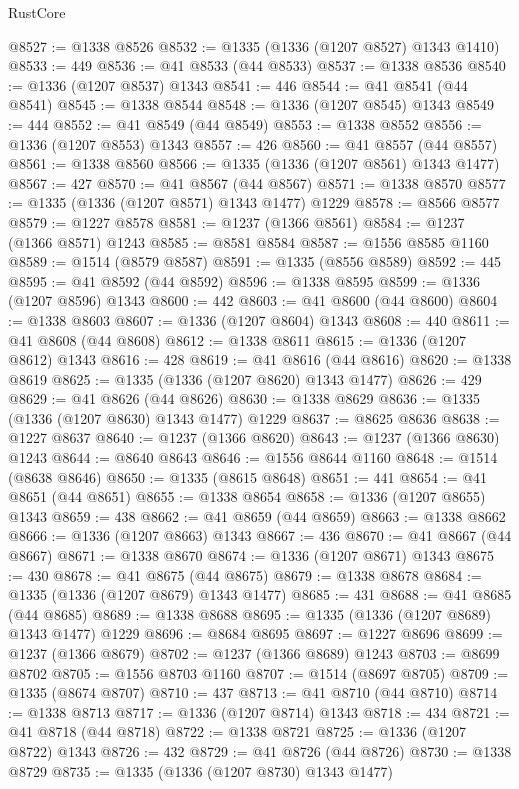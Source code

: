 \begin{lexlean}{RustCore}
\begin{coremodule}
@8527 := @1338 @8526
@8532 := @1335 (@1336 (@1207 @8527) @1343 @1410)
@8533 := 449
@8536 := @41 @8533 (@44 @8533)
@8537 := @1338 @8536
@8540 := @1336 (@1207 @8537) @1343
@8541 := 446
@8544 := @41 @8541 (@44 @8541)
@8545 := @1338 @8544
@8548 := @1336 (@1207 @8545) @1343
@8549 := 444
@8552 := @41 @8549 (@44 @8549)
@8553 := @1338 @8552
@8556 := @1336 (@1207 @8553) @1343
@8557 := 426
@8560 := @41 @8557 (@44 @8557)
@8561 := @1338 @8560
@8566 := @1335 (@1336 (@1207 @8561) @1343 @1477)
@8567 := 427
@8570 := @41 @8567 (@44 @8567)
@8571 := @1338 @8570
@8577 := @1335 (@1336 (@1207 @8571) @1343 @1477) @1229
@8578 := @8566 @8577
@8579 := @1227 @8578
@8581 := @1237 (@1366 @8561)
@8584 := @1237 (@1366 @8571) @1243
@8585 := @8581 @8584
@8587 := @1556 @8585 @1160
@8589 := @1514 (@8579 @8587)
@8591 := @1335 (@8556 @8589)
@8592 := 445
@8595 := @41 @8592 (@44 @8592)
@8596 := @1338 @8595
@8599 := @1336 (@1207 @8596) @1343
@8600 := 442
@8603 := @41 @8600 (@44 @8600)
@8604 := @1338 @8603
@8607 := @1336 (@1207 @8604) @1343
@8608 := 440
@8611 := @41 @8608 (@44 @8608)
@8612 := @1338 @8611
@8615 := @1336 (@1207 @8612) @1343
@8616 := 428
@8619 := @41 @8616 (@44 @8616)
@8620 := @1338 @8619
@8625 := @1335 (@1336 (@1207 @8620) @1343 @1477)
@8626 := 429
@8629 := @41 @8626 (@44 @8626)
@8630 := @1338 @8629
@8636 := @1335 (@1336 (@1207 @8630) @1343 @1477) @1229
@8637 := @8625 @8636
@8638 := @1227 @8637
@8640 := @1237 (@1366 @8620)
@8643 := @1237 (@1366 @8630) @1243
@8644 := @8640 @8643
@8646 := @1556 @8644 @1160
@8648 := @1514 (@8638 @8646)
@8650 := @1335 (@8615 @8648)
@8651 := 441
@8654 := @41 @8651 (@44 @8651)
@8655 := @1338 @8654
@8658 := @1336 (@1207 @8655) @1343
@8659 := 438
@8662 := @41 @8659 (@44 @8659)
@8663 := @1338 @8662
@8666 := @1336 (@1207 @8663) @1343
@8667 := 436
@8670 := @41 @8667 (@44 @8667)
@8671 := @1338 @8670
@8674 := @1336 (@1207 @8671) @1343
@8675 := 430
@8678 := @41 @8675 (@44 @8675)
@8679 := @1338 @8678
@8684 := @1335 (@1336 (@1207 @8679) @1343 @1477)
@8685 := 431
@8688 := @41 @8685 (@44 @8685)
@8689 := @1338 @8688
@8695 := @1335 (@1336 (@1207 @8689) @1343 @1477) @1229
@8696 := @8684 @8695
@8697 := @1227 @8696
@8699 := @1237 (@1366 @8679)
@8702 := @1237 (@1366 @8689) @1243
@8703 := @8699 @8702
@8705 := @1556 @8703 @1160
@8707 := @1514 (@8697 @8705)
@8709 := @1335 (@8674 @8707)
@8710 := 437
@8713 := @41 @8710 (@44 @8710)
@8714 := @1338 @8713
@8717 := @1336 (@1207 @8714) @1343
@8718 := 434
@8721 := @41 @8718 (@44 @8718)
@8722 := @1338 @8721
@8725 := @1336 (@1207 @8722) @1343
@8726 := 432
@8729 := @41 @8726 (@44 @8726)
@8730 := @1338 @8729
@8735 := @1335 (@1336 (@1207 @8730) @1343 @1477)

\end{coremodule}
\end{lexlean}
